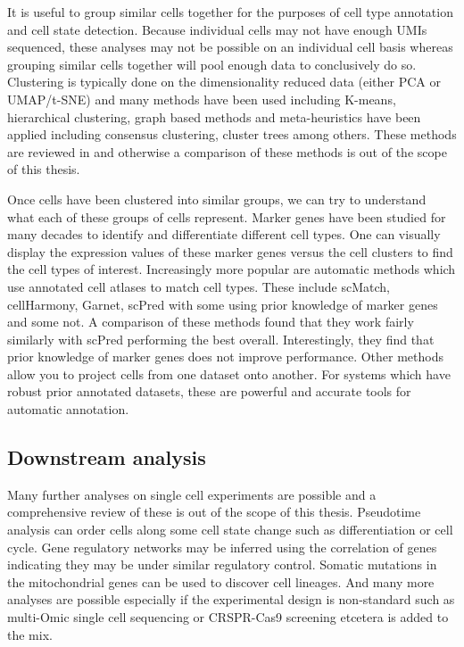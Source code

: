 \par{
It is useful to group similar cells together for the purposes of cell type annotation and cell state detection. Because individual cells may not have enough UMIs sequenced, these analyses may not be possible on an individual cell basis whereas grouping similar cells together will pool enough data to conclusively do so. Clustering is typically done on the dimensionality reduced data (either PCA or UMAP/t-SNE) and many methods have been used including K-means, hierarchical clustering, graph based methods and meta-heuristics have been applied including consensus clustering, cluster trees among others\cite{scclustreview}\cite{subpop}\cite{sc3}\cite{clustree}. These methods are reviewed in \cite{scclustreview} and otherwise a comparison of these methods is out of the scope of this thesis.
} \\

\par{
Once cells have been clustered into similar groups, we can try to understand what each of these groups of cells represent. Marker genes have been studied for many decades to identify and differentiate different cell types. One can visually display the expression values of these marker genes versus the cell clusters to find the cell types of interest. Increasingly more popular are automatic methods which use annotated cell atlases to match cell types. These include scMatch\cite{scMatch}, cellHarmony\cite{cellHarmony}, Garnet\cite{Garnet}, scPred\cite{scPred} with some using prior knowledge of marker genes and some not. A comparison of these methods found that they work fairly similarly with scPred performing the best overall. Interestingly, they find that prior knowledge of marker genes does not improve performance. Other methods allow you to project cells from one dataset onto another\cite{scmap}. For systems which have robust prior annotated datasets, these are powerful and accurate tools for automatic annotation.
}



\subsection{Downstream analysis}
\par{
Many further analyses on single cell experiments are possible and a comprehensive review of these is out of the scope of this thesis. Pseudotime analysis can order cells along some cell state change such as differentiation or cell cycle\cite{pseudotime}\cite{scHOT}. Gene regulatory networks may be inferred using the correlation of genes indicating they may be under similar regulatory control\cite{scenic}. Somatic mutations in the mitochondrial genes can be used to discover cell lineages\cite{lineage}. And many more analyses are possible especially if the experimental design is non-standard such as multi-Omic single cell sequencing or CRSPR-Cas9 screening\cite{perturb} etcetera is added to the mix.
}

